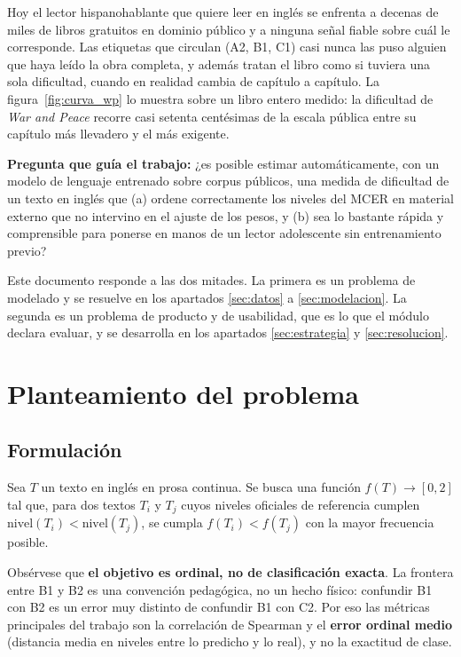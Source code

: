 \documentclass[11pt,a4paper]{article}
\begin{document}
Hoy el lector hispanohablante que quiere leer en inglés se enfrenta a decenas de miles
de libros gratuitos en dominio público y a ninguna señal fiable sobre cuál le
corresponde. Las etiquetas que circulan (A2, B1, C1) casi nunca las puso alguien que
haya leído la obra completa, y además tratan el libro como si tuviera una sola
dificultad, cuando en realidad cambia de capítulo a capítulo. La
figura~\ref{fig:curva_wp} lo muestra sobre un libro entero medido: la dificultad de
\emph{War and Peace} recorre casi setenta centésimas de la escala pública entre su
capítulo más llevadero y el más exigente.

\vspace{0.2cm}
\noindent\textbf{Pregunta que guía el trabajo:} ¿es posible estimar automáticamente,
con un modelo de lenguaje entrenado sobre corpus públicos, una medida de dificultad de
un texto en inglés que (a) ordene correctamente los niveles del MCER
\parencite{coe2020cefr} en material externo que no intervino en el ajuste de los pesos, y (b) sea lo
bastante rápida y comprensible para ponerse en manos de un lector adolescente sin
entrenamiento previo?

Este documento responde a las dos mitades. La primera es un problema de modelado y se
resuelve en los apartados \ref{sec:datos} a \ref{sec:modelacion}. La segunda es un
problema de producto y de usabilidad, que es lo que el módulo declara evaluar, y se
desarrolla en los apartados \ref{sec:estrategia} y \ref{sec:resolucion}.

\section{Planteamiento del problema}

\subsection{Formulación}
\label{sec:formulacion}

Sea $T$ un texto en inglés en prosa continua. Se busca una función
$f(T) \rightarrow [0, 2]$ tal que, para dos textos $T_i$ y $T_j$ cuyos niveles
oficiales de referencia cumplen $\text{nivel}(T_i) < \text{nivel}(T_j)$, se cumpla
$f(T_i) < f(T_j)$ con la mayor frecuencia posible.

Obsérvese que \textbf{el objetivo es ordinal, no de clasificación exacta}. La frontera
entre B1 y B2 es una convención pedagógica, no un hecho físico: confundir B1 con B2 es
un error muy distinto de confundir B1 con C2. Por eso las métricas principales del
trabajo son la correlación de Spearman y el \textbf{error ordinal medio} (distancia
media en niveles entre lo predicho y lo real), y no la exactitud de clase.
\end{document}
